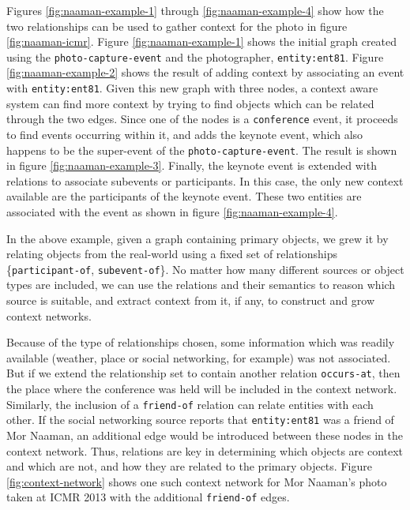 Figures \ref{fig:naaman-example-1} through \ref{fig:naaman-example-4} show how the two relationships can be used to gather context for the photo in figure \ref{fig:naaman-icmr}. Figure \ref{fig:naaman-example-1} shows the initial graph created using the \texttt{photo-capture-event} and the photographer, \texttt{entity:ent81}. Figure \ref{fig:naaman-example-2} shows the result of adding context by associating an event with \texttt{entity:ent81}. Given this new graph with three nodes, a context aware system can find more context by trying to find objects which can be related through the two edges. Since one of the nodes is a \texttt{conference} event, it proceeds to find events occurring within it, and adds the keynote event, which also happens to be the super-event of the \texttt{photo-capture-event}. The result is shown in figure \ref{fig:naaman-example-3}. Finally, the keynote event is extended with relations to associate subevents or participants. In this case, the only new context available are the participants of the keynote event. These two entities are associated with the event as shown in figure \ref{fig:naaman-example-4}. 

In the above example, given a graph containing primary objects, we grew it by relating objects from the real-world using a fixed set of relationships \{\texttt{participant-of}, \texttt{subevent-of}\}. No matter how many different sources or object types are included, we can use the relations and their semantics to reason which source is suitable, and extract context from it, if any, to construct and grow context networks. 

Because of the type of relationships chosen, some information which was readily available (weather, place or social networking, for example) was not associated. But if we extend the relationship set to contain another relation \texttt{occurs-at}, then the place where the conference was held will be included in the context network. Similarly, the inclusion of a \texttt{friend-of} relation can relate entities with each other. If the social networking source reports that \texttt{entity:ent81} was a friend of Mor Naaman, an additional edge would be introduced between these nodes in the context network. Thus, relations are key in determining which objects are context and which are not, and how they are related to the primary objects. Figure \ref{fig:context-network} shows one such context network for Mor Naaman's photo taken at ICMR 2013 with the additional \texttt{friend-of} edges.

